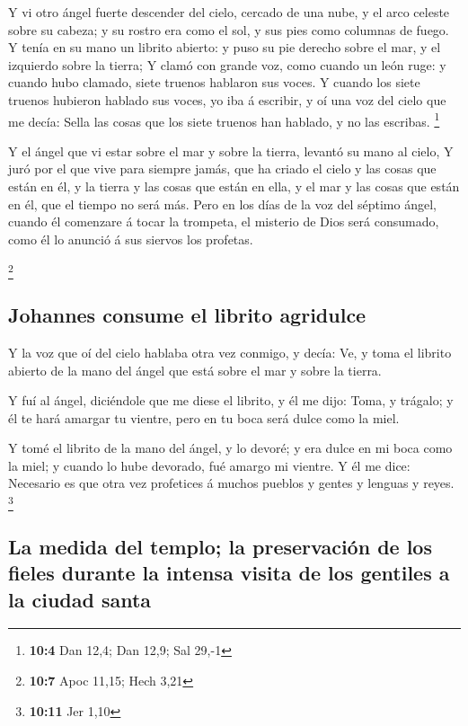  Y vi otro ángel fuerte descender del cielo, cercado de una
nube, y el arco celeste sobre su cabeza; y su rostro era como el sol, y
sus pies como columnas de fuego.  Y tenía en su mano un
librito abierto: y puso su pie derecho sobre el mar, y el izquierdo
sobre la tierra;  Y clamó con grande voz, como cuando un
león ruge: y cuando hubo clamado, siete truenos hablaron sus voces.
 Y cuando los siete truenos hubieron hablado sus voces, yo
iba á escribir, y oí una voz del cielo que me decía: Sella las cosas que
los siete truenos han hablado, y no las escribas. \footnote{\textbf{10:4}
  Dan 12,4; Dan 12,9; Sal 29,-1}

 Y el ángel que vi estar sobre el mar y sobre la tierra,
levantó su mano al cielo,  Y juró por el que vive para
siempre jamás, que ha criado el cielo y las cosas que están en él, y la
tierra y las cosas que están en ella, y el mar y las cosas que están en
él, que el tiempo no será más.  Pero en los días de la voz
del séptimo ángel, cuando él comenzare á tocar la trompeta, el misterio
de Dios será consumado, como él lo anunció á sus siervos los profetas.

\footnote{\textbf{10:7} Apoc 11,15; Hech 3,21}

\hypertarget{johannes-consume-el-librito-agridulce}{%
\subsection{Johannes consume el librito
agridulce}\label{johannes-consume-el-librito-agridulce}}

 Y la voz que oí del cielo hablaba otra vez conmigo, y
decía: Ve, y toma el librito abierto de la mano del ángel que está sobre
el mar y sobre la tierra.

 Y fuí al ángel, diciéndole que me diese el librito, y él me
dijo: Toma, y trágalo; y él te hará amargar tu vientre, pero en tu boca
será dulce como la miel.

 Y tomé el librito de la mano del ángel, y lo devoré; y era
dulce en mi boca como la miel; y cuando lo hube devorado, fué amargo mi
vientre.  Y él me dice: Necesario es que otra vez
profetices á muchos pueblos y gentes y lenguas y reyes. \footnote{\textbf{10:11}
  Jer 1,10}

\hypertarget{la-medida-del-templo-la-preservaciuxf3n-de-los-fieles-durante-la-intensa-visita-de-los-gentiles-a-la-ciudad-santa}{%
\subsection{La medida del templo; la preservación de los fieles durante
la intensa visita de los gentiles a la ciudad
santa}\label{la-medida-del-templo-la-preservaciuxf3n-de-los-fieles-durante-la-intensa-visita-de-los-gentiles-a-la-ciudad-santa}}

